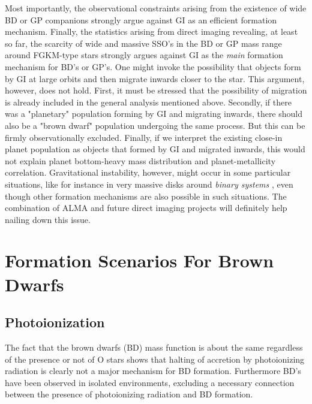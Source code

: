 Most importantly, the observational constraints arising from the existence of wide BD or GP companions strongly argue against GI as an efficient formation mechanism. 
Finally, the statistics arising from direct imaging revealing, at least so far, the scarcity of wide and massive SSO's in the BD or GP mass range around FGKM-type stars strongly argues against GI as the {\it main} formation mechanism for BD's or GP's. 
One might invoke the possibility that objects form by GI at large orbits and then migrate inwards closer to the star. 
This argument, however, does not hold. First, it must be stressed that
the possibility of migration is already included in the general analysis mentioned above. Secondly, if there was a "planetary" population forming by GI and migrating inwards, there should also be a "brown dwarf" population undergoing the same process. But this can be firmly observationally excluded. Finally, if we interpret the existing close-in planet population as objects that
formed by GI and migrated inwards, this would not explain planet bottom-heavy mass distribution and planet-metallicity correlation.
Gravitational instability, however, might occur in some particular situations, like for instance in very massive disks around {\it binary systems} \citep{Delorme2013}, even though other formation mechanisms are also possible in such situations.
The combination of ALMA and future direct imaging projects will definitely help nailing down this issue.

\section{Formation Scenarios For Brown Dwarfs}

\subsection{Photoionization}
The fact that the brown dwarfs (BD) mass function is about the same regardless of the presence or not of O stars shows that halting
of accretion by photoionizing radiation \citep{Whitworth2004} is clearly not a major mechanism for BD 
formation. Furthermore BD’s have been observed in isolated environments, excluding a necessary
connection between the presence of photoionizing radiation and BD formation.

